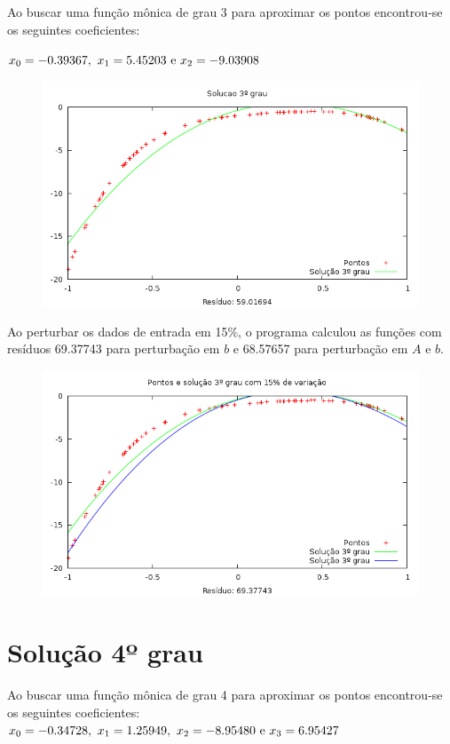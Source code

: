 Ao buscar uma função mônica de grau 3 para aproximar os pontos encontrou-se os seguintes 
coeficientes:

\(x_0 = -0.39367  ,~  x_1 = 5.45203  ~$e$~ x_2 = -9.03908 \)

\begin{figure}[h]
\centering
\includegraphics[scale=0.7]{sol3grau}
\end{figure}

Ao perturbar os dados de entrada em 15\%, o programa calculou as funções 
com resíduos 69.37743  para perturbação em $b$ e 68.57657 para perturbação em $A$ e $b$.
\begin{figure}[h]
\centering
\includegraphics[scale=0.7]{sol3grau_var}
\end{figure}

\newpage
\section{Solução 4º grau}

Ao buscar uma função mônica de grau 4 para aproximar os pontos encontrou-se os seguintes 
coeficientes:
\(x_0 = -0.34728 ,~  x_1 = 1.25949,~ x_2 =  -8.95480 ~$e$~ x_3 = 6.95427 \)

